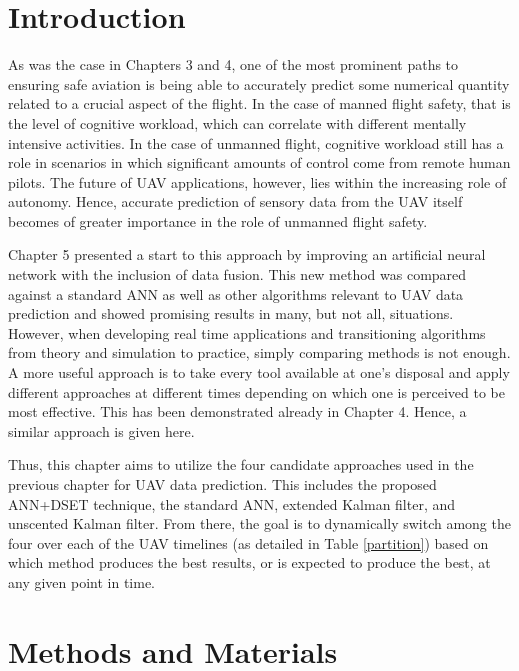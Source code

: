 \documentclass[12pt]{uthesis-v12}  %
\begin{document}
\section{Introduction}

As was the case in Chapters 3 and 4, one of the most prominent paths to ensuring safe aviation is being able to accurately predict some numerical quantity related to a crucial aspect of the flight. In the case of manned flight safety, that is the level of cognitive workload, which can correlate with different mentally intensive activities. In the case of unmanned flight, cognitive workload still has a role in scenarios in which significant amounts of control come from remote human pilots. The future of UAV applications, however, lies within the increasing role of autonomy. Hence, accurate prediction of sensory data from the UAV itself becomes of greater importance in the role of unmanned flight safety.

Chapter 5 presented a start to this approach by improving an artificial neural network with the inclusion of data fusion. This new method was compared against a standard ANN as well as other algorithms relevant to UAV data prediction and showed promising results in many, but not all, situations. However, when developing real time applications and transitioning algorithms from theory and simulation to practice, simply comparing methods is not enough. A more useful approach is to take every tool available at one's disposal and apply different approaches at different times depending on which one is perceived to be most effective. This has been demonstrated already in Chapter 4. Hence, a similar approach is given here.

Thus, this chapter aims to utilize the four candidate approaches used in the previous chapter for UAV data prediction. This includes the proposed ANN+DSET technique, the standard ANN, extended Kalman filter, and unscented Kalman filter. From there, the goal is to dynamically switch among the four over each of the UAV timelines (as detailed in Table \ref{partition}) based on which method produces the best results, or is expected to produce the best, at any given point in time.

\section{Methods and Materials}
\end{document}

